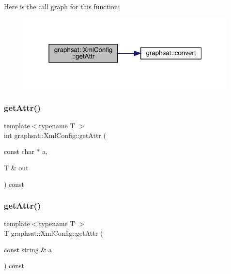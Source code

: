 Here is the call graph for this function\+:\nopagebreak
\begin{figure}[H]
\begin{center}
\leavevmode
\includegraphics[width=316pt]{classgraphsat_1_1_xml_config_a348451001c3d7c1f842fc77ad82cef81_cgraph}
\end{center}
\end{figure}
\mbox{\label{classgraphsat_1_1_xml_config_af84cfca495ac2835dd7f4d196c80b6cb}} 
\subsubsection{\texorpdfstring{getAttr()}{getAttr()}\hspace{0.1cm}{\footnotesize\ttfamily [2/4]}}
{\footnotesize\ttfamily template$<$typename T $>$ \\
int graphsat\+::\+Xml\+Config\+::get\+Attr (\begin{DoxyParamCaption}\item[{const char $\ast$}]{a,  }\item[{T \&}]{out }\end{DoxyParamCaption}) const\hspace{0.3cm}{\ttfamily [inline]}}

\mbox{\label{classgraphsat_1_1_xml_config_a3ac85be6da0905da1e133d519c7e589c}} 
\subsubsection{\texorpdfstring{getAttr()}{getAttr()}\hspace{0.1cm}{\footnotesize\ttfamily [3/4]}}
{\footnotesize\ttfamily template$<$typename T $>$ \\
T graphsat\+::\+Xml\+Config\+::get\+Attr (\begin{DoxyParamCaption}\item[{const string \&}]{a }\end{DoxyParamCaption}) const\hspace{0.3cm}{\ttfamily [inline]}}

